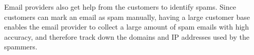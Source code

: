 Email providers also get help from the customers to identify spams. Since
customers can mark an email as spam manually, having a large customer base
enables the email provider to collect a large amount of spam emails with high
accuracy, and therefore track down the domains and IP addresses used by the 
spammers.